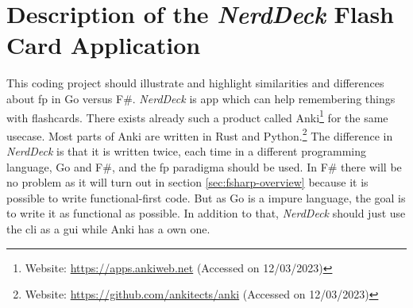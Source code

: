     \section{Description of the \textit{NerdDeck} Flash Card Application}\label{sec:description}
    This coding project should illustrate and highlight similarities and differences about \ac{fp} in Go versus F\#.
    \textit{NerdDeck} is app which can help remembering things with flashcards. There exists already such a product called Anki\footnote{Website: \url{https://apps.ankiweb.net} (Accessed on 12/03/2023)} for the same usecase. Most parts of Anki are written in Rust and Python.\footnote{Website: \url{https://github.com/ankitects/anki} (Accessed on 12/03/2023)} The difference in \textit{NerdDeck} is that it is written twice, each time in a different programming language, Go and F\#, and the \ac{fp} paradigma should be used. In F\# there will be no problem as it will turn out in section \ref{sec:fsharp-overview} because it is possible to write functional-first code. But as Go is a impure language, the goal is to write it as functional as possible. In addition to that, \textit{NerdDeck} should just use the \ac{cli} as a \ac{gui} while Anki has a own one.

